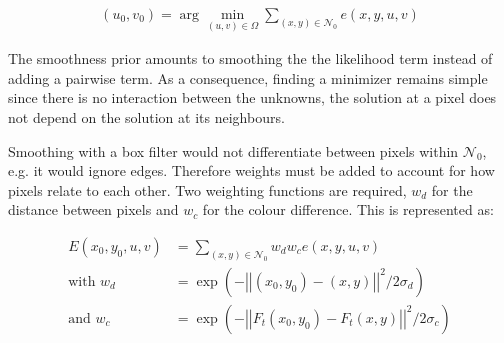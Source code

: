 \begin{align*}
  (u_0,v_0) = \arg\min_{(u,v)\in\Omega} \sum_{(x,y)\in\mathcal{N}_0} e(x,y,u,v)
\end{align*}

The smoothness prior amounts to smoothing the  the likelihood term instead of adding a pairwise term. As a consequence, finding a minimizer remains simple since there is no interaction between the unknowns, the solution at a pixel does not depend on the solution at its neighbours.

Smoothing with a box filter would not differentiate between pixels within $\mathcal{N}_0$, e.g. it would ignore edges. Therefore weights must be added to account for how pixels relate to each other. Two weighting functions are required, $w_d$ for the distance between pixels and $w_c$ for the colour difference. This is represented as:

\begin{align*}
  E(x_0, y_0, u, v) &= \sum_{(x, y) \in \mathcal{N}_0} w_d w_c e(x, y, u, v) \\
  \text{with } w_d &= \exp\left(-\left|\left| (x_0, y_0) - (x, y)\right|\right|^2 / 2\sigma_d\right) \\
  \text{and } w_c &= \exp\left(-\left|\left| F_t(x_0, y_0) - F_t(x, y)\right|\right|^2 / 2\sigma_c\right)
\end{align*}